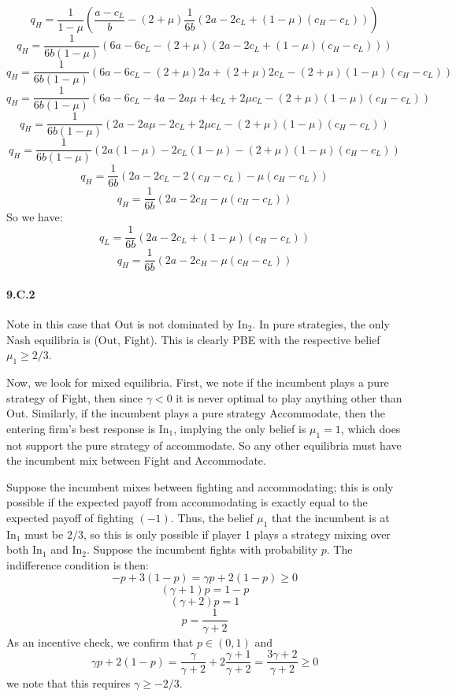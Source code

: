 \documentclass[10pt,letter]{article}
\begin{document}
\[ q_H = \frac{1}{1-\mu}\left(\frac{a - c_L}{b} - (2 + \mu) \frac{1}{6b}\left( 2a - 2 c_L + (1-\mu)(c_H - c_L)\right) \right) \]
\[ q_H = \frac{1}{6b(1-\mu)}\left(6a - 6c_L - (2 + \mu)\left( 2a - 2 c_L + (1-\mu)(c_H - c_L)\right) \right) \]
\[ q_H = \frac{1}{6b(1-\mu)}\left(6a - 6c_L - (2 + \mu)2a + (2 + \mu)2 c_L - (2 + \mu)(1-\mu)(c_H - c_L)\right) \]
\[ q_H = \frac{1}{6b(1-\mu)}\left(6a - 6c_L - 4a - 2a \mu + 4c_L + 2 \mu c_L - (2 + \mu)(1-\mu)(c_H - c_L)\right) \]
\[ q_H = \frac{1}{6b(1-\mu)}\left(2a - 2a \mu  - 2c_L + 2 \mu c_L - (2 + \mu)(1-\mu)(c_H - c_L)\right) \]
\[ q_H = \frac{1}{6b(1-\mu)}\left(2a(1- \mu)  - 2c_L(1-\mu) - (2 + \mu)(1-\mu)(c_H - c_L)\right) \]
\[ q_H = \frac{1}{6b}\left(2a  - 2c_L - 2(c_H - c_L) - \mu(c_H - c_L)\right) \]
\[ q_H = \frac{1}{6b}\left(2a  - 2c_H - \mu(c_H - c_L)\right) \]
So we have:
\[ q_L = \frac{1}{6b}\left( 2a - 2 c_L + (1-\mu)(c_H - c_L)\right)     \]
\[ q_H = \frac{1}{6b}\left(2a  - 2c_H - \mu(c_H - c_L)\right) \]
\paragraph*{9.C.2}
Note in this case that Out is not dominated by In$_2$. In pure strategies, the only Nash equilibria is (Out, Fight). This is clearly PBE with the respective belief $\mu_1 \ge 2/3$.

Now, we look for mixed equilibria. First, we note if the incumbent plays a pure strategy of Fight, then since $\gamma < 0$ it is never optimal to play anything other than Out. Similarly, if the incumbent plays a pure strategy Accommodate, then the entering firm's best response is In$_1$, implying the only belief is $\mu_1 = 1$, which does not support the pure strategy of accommodate. So any other equilibria must have the incumbent mix between Fight and Accommodate.

Suppose the incumbent mixes between fighting and accommodating; this is only possible if the expected payoff from accommodating is exactly equal to the expected payoff of fighting $(-1)$. Thus, the belief $\mu_1$ that the incumbent is at In$_1$ must be $2/3$, so this is only possible if player 1 plays a strategy mixing over both In$_1$ and In$_2$. Suppose the incumbent fights with probability $p$. The indifference condition is then:
\[ -p + 3(1-p) = \gamma p + 2(1-p) \ge 0 \]
\[ (\gamma + 1)p = 1 - p \]
\[ (\gamma + 2)p = 1 \]
\[ p = \frac{1}{\gamma + 2} \]
As an incentive check, we confirm that $p \in (0,1)$ and
\[ \gamma p + 2(1-p) = \frac{\gamma}{\gamma + 2} + 2\frac{\gamma + 1}{\gamma + 2} = \frac{3\gamma + 2}{\gamma + 2} \ge 0\]
we note that this requires $\gamma \ge -2/3$.
\end{document}
